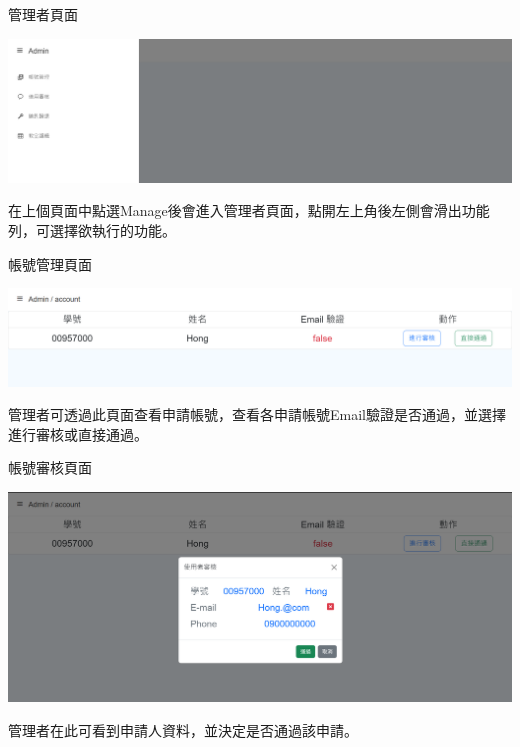 \documentclass{article}
\begin{document}
\begin{Large}
	管理者頁面
\end{Large}
\bigskip
\begin{center}
	\includegraphics[scale=0.35]{SDDAdminPage.png}
\end{center}
\bigskip
\bigskip
在上個頁面中點選Manage後會進入管理者頁面，點開左上角後左側會滑出功能列，可選擇欲執行的功能。
\bigskip
\bigskip
\hspace*{\fill} 

\newpage

\begin{Large}
	帳號管理頁面
\end{Large}
\bigskip
\begin{center}
	\includegraphics[scale=0.35]{SDDAdminAccountManage.png}
\end{center}
\bigskip
\bigskip
管理者可透過此頁面查看申請帳號，查看各申請帳號Email驗證是否通過，並選擇進行審核或直接通過。
\bigskip
\bigskip
\bigskip
\bigskip
\bigskip
\bigskip
\hspace*{\fill} 

\begin{Large}
	帳號審核頁面
\end{Large}
\bigskip
\begin{center}
	\includegraphics[scale=0.35]{SDDAdminAccountVerify.png}
\end{center}
\bigskip
\bigskip
管理者在此可看到申請人資料，並決定是否通過該申請。
\newpage
\end{document}
